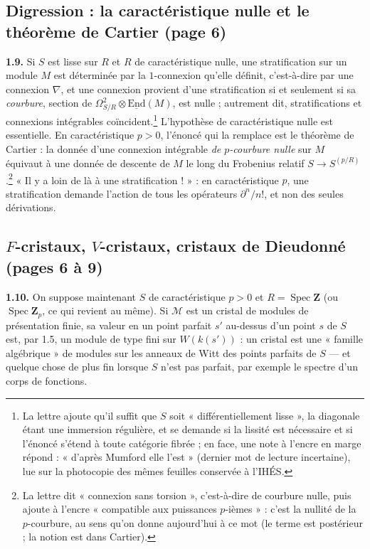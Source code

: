 \documentclass[11pt,a4paper]{article}
\begin{document}
\subsection*{Digression : la caractéristique nulle et le théorème de Cartier (page 6)}

\textbf{1.9.} Si $S$ est lisse sur $R$ et $R$ de caractéristique nulle, une
stratification sur un module $M$ est déterminée par la $1$-connexion qu'elle
définit, c'est-à-dire par une connexion $\nabla$, et une connexion provient
d'une stratification si et seulement si sa \emph{courbure}, section de
$\Omega^2_{S/R} \otimes \underline{\mathrm{End}}(M)$, est nulle ; autrement
dit, stratifications et connexions intégrables coïncident.\footnote{La lettre
ajoute qu'il suffit que $S$ soit « différentiellement lisse », la diagonale
étant une immersion régulière, et se demande si la lissité est nécessaire et si
l'énoncé s'étend à toute catégorie fibrée ; en face, une note à l'encre en
marge répond : « d'après Mumford elle l'est » (dernier mot de lecture
incertaine), lue sur la photocopie des mêmes feuilles conservée à l'IHÉS.} L'hypothèse de caractéristique
nulle est essentielle. En caractéristique $p > 0$, l'énoncé qui la remplace est
le théorème de Cartier : la donnée d'une connexion intégrable \emph{de
$p$-courbure nulle} sur $M$ équivaut à une donnée de descente de $M$ le long
du Frobenius relatif $S \to S^{(p/R)}$.\footnote{La lettre dit « connexion sans
torsion », c'est-à-dire de courbure nulle, puis ajoute à l'encre « compatible
aux puissances $p$-ièmes » : c'est la nullité de la $p$-courbure, au sens
qu'on donne aujourd'hui à ce mot (le terme est postérieur ; la notion est dans
Cartier).} « Il y a loin de là à une stratification ! » : en caractéristique
$p$, une stratification demande l'action de tous les opérateurs
$\partial^n/n!$, et non des seules dérivations.

\subsection*{$F$-cristaux, $V$-cristaux, cristaux de Dieudonné (pages 6 à 9)}

\textbf{1.10.} On suppose maintenant $S$ de caractéristique $p > 0$ et
$R = \operatorname{Spec}\mathbf{Z}$ (ou $\operatorname{Spec}\mathbf{Z}_p$, ce
qui revient au même). Si $\mathcal{M}$ est un cristal de modules de
présentation finie, sa valeur en un point parfait $s'$ au-dessus d'un point
$s$ de $S$ est, par 1.5, un module de type fini sur $W(k(s'))$ : un cristal est
une « famille algébrique » de modules sur les anneaux de Witt des points
parfaits de $S$ — et quelque chose de plus fin lorsque $S$ n'est pas parfait,
par exemple le spectre d'un corps de fonctions.
\end{document}
